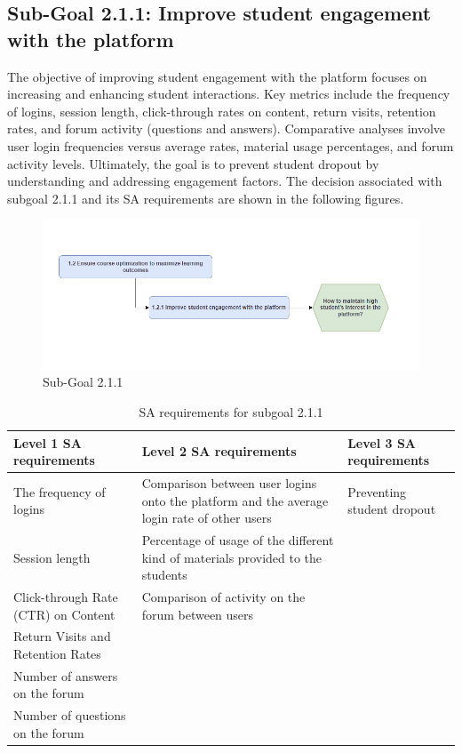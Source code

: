 \subsection{Sub-Goal 2.1.1: Improve student engagement with the platform}
The objective of improving student engagement with the platform focuses on increasing and enhancing student interactions. Key metrics include the frequency of logins, session length, click-through rates on content, return visits, retention rates, and forum activity (questions and answers). Comparative analyses involve user login frequencies versus average rates, material usage percentages, and forum activity levels. Ultimately, the goal is to prevent student dropout by understanding and addressing engagement factors.
The decision associated with subgoal 2.1.1 and its SA requirements are shown in the following figures.
\begin{figure}[H]
    \centering
    \includegraphics[width=\textwidth]{./assets/subgoal_1.2.1.png}
    \caption{Sub-Goal 2.1.1}
    \label{fig:subgoal1.2.1}
\end{figure}

\begin{table}[H]
\begin{center}
\begin{tabular}{ | m{5cm} | m{5cm}| m{5cm} | } 
  \hline
  \textbf{Level 1 SA requirements} & \textbf{Level 2 SA requirements}  & \textbf{Level 3 SA requirements}  \\ 
  \hline
  The frequency of logins & Comparison between user logins onto the platform and the average login rate of other users & Preventing student dropout \\ 
  \hline
  Session length & Percentage of usage of the different kind of materials provided to the students & \\ 
  \hline
  Click-through Rate (CTR) on Content & Comparison of activity on the forum between users & \\ 
  \hline
  Return Visits and Retention Rates &  & \\ 
  \hline
  Number of answers on the forum &  & \\ 
  \hline
  Number of questions on the forum &  & \\ 
  \hline
\end{tabular}
\end{center}
\caption{SA requirements for subgoal 2.1.1}
\end{table}

